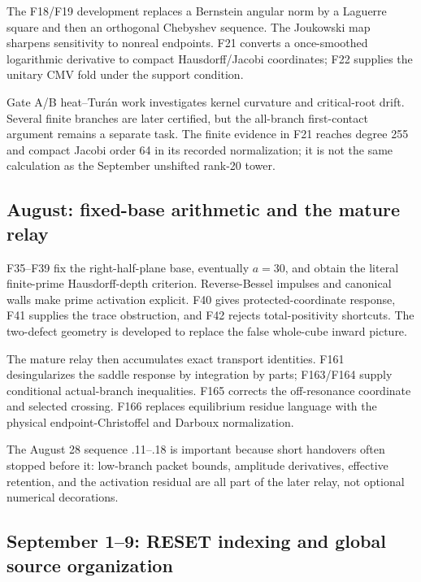 \documentclass[
  10pt,
  a4paper,
  10pt,
  oneside,
  openany]{book}
\begin{document}
The F18/F19 development replaces a Bernstein angular norm by a Laguerre
square and then an orthogonal Chebyshev sequence. The Joukowski map
sharpens sensitivity to nonreal endpoints. F21 converts a once-smoothed
logarithmic derivative to compact Hausdorff/Jacobi coordinates; F22
supplies the unitary CMV fold under the support condition.

Gate A/B heat--Turán work investigates kernel curvature and
critical-root drift. Several finite branches are later certified, but
the all-branch first-contact argument remains a separate task. The
finite evidence in F21 reaches degree 255 and compact Jacobi order 64 in
its recorded normalization; it is not the same calculation as the
September unshifted rank-20 tower.

\subsection{August: fixed-base arithmetic and the mature
relay}\label{august-fixed-base-arithmetic-and-the-mature-relay}

F35--F39 fix the right-half-plane base, eventually \(a=30\), and obtain
the literal finite-prime Hausdorff-depth criterion. Reverse-Bessel
impulses and canonical walls make prime activation explicit. F40 gives
protected-coordinate response, F41 supplies the trace obstruction, and
F42 rejects total-positivity shortcuts. The two-defect geometry is
developed to replace the false whole-cube inward picture.

The mature relay then accumulates exact transport identities. F161
desingularizes the saddle response by integration by parts; F163/F164
supply conditional actual-branch inequalities. F165 corrects the
off-resonance coordinate and selected crossing. F166 replaces
equilibrium residue language with the physical endpoint-Christoffel and
Darboux normalization.

The August 28 sequence .11--.18 is important because short handovers
often stopped before it: low-branch packet bounds, amplitude
derivatives, effective retention, and the activation residual are all
part of the later relay, not optional numerical decorations.

\subsection{September 1--9: RESET indexing and global source
organization}\label{september-19-reset-indexing-and-global-source-organization}
\end{document}
